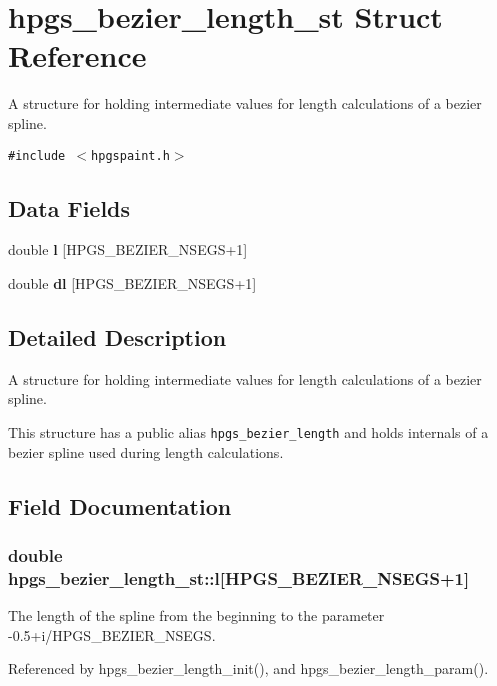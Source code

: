 \section{hpgs\_\-bezier\_\-length\_\-st Struct Reference}
\label{structhpgs__bezier__length__st}
A structure for holding intermediate values for length calculations of a bezier spline.  


{\tt \#include $<$hpgspaint.h$>$}

\subsection*{Data Fields}
\begin{CompactItemize}
\item 
double {\bf l} [HPGS\_\-BEZIER\_\-NSEGS+1]
\item 
double {\bf dl} [HPGS\_\-BEZIER\_\-NSEGS+1]
\end{CompactItemize}


\subsection{Detailed Description}
A structure for holding intermediate values for length calculations of a bezier spline. 

This structure has a public alias {\tt hpgs\_\-bezier\_\-length} and holds internals of a bezier spline used during length calculations. 

\subsection{Field Documentation}
\subsubsection[l]{\setlength{\rightskip}{0pt plus 5cm}double {\bf hpgs\_\-bezier\_\-length\_\-st::l}[HPGS\_\-BEZIER\_\-NSEGS+1]}\label{structhpgs__bezier__length__st_59bf18b9efbb949ab3c75a56e0c39e4f}


The length of the spline from the beginning to the parameter -0.5+i/HPGS\_\-BEZIER\_\-NSEGS. 

Referenced by hpgs\_\-bezier\_\-length\_\-init(), and hpgs\_\-bezier\_\-length\_\-param().
